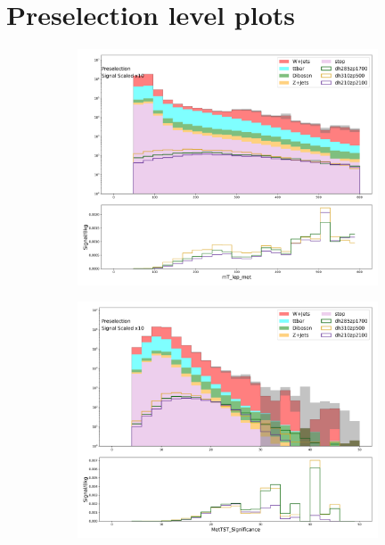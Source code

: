 \label{chapter:appendix}

\section{Preselection level plots}
\begin{figure}[htbp]
  \centering

     \begin{subfigure}{0.49\textwidth}
     \includegraphics[width = 0.98\textwidth]{Figures/appendix/Preselection/mT_lep_met.png}
     \caption{\mtlepmet}
     \end{subfigure}
     \begin{subfigure}{0.49\textwidth}
     \includegraphics[width = 0.98\textwidth]{Figures/appendix/Preselection/MetTST_Significance.png}

\end{subfigure}
\end{figure}

